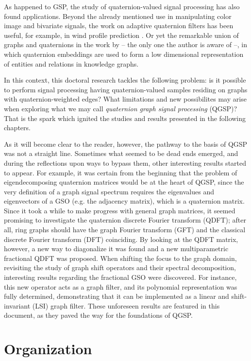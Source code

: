 As happened to GSP, the study of quaternion-valued signal processing has also found applications. Beyond the already mentioned use in manipulating color image and bivariate signals, the work on adaptive quaternion filters has been useful, for example, in wind profile prediction \cite{jiang2014general}. Or yet the remarkable union of graphs and quaternions in the work by \cite{zhang2019quaternion} -- the only one the author is aware of --, in which quaternion embeddings are used to form a low dimensional representation of entities and relations in knowledge graphs.

In this context, this doctoral research tackles the following problem: is it possible to perform signal processing having quaternion-valued samples residing on graphs with quaternion-weighted edges? What limitations and new possibilites may arise when exploring what we may call \textit{quaternion graph signal processing} (QGSP)? That is the spark which ignited the studies and results presented in the following chapters.

As it will become clear to the reader, however, the pathway to the basis of QGSP was not a straight line. Sometimes what seemed to be dead ends emerged, and during the reflections upon ways to bypass them, other interesting results started to appear. For example, it was certain from the beginning that the problem of eigendecomposing quaternion matrices would be at the heart of QGSP, since the very definition of a graph signal spectrum requires the eigenvalues and eigenvectors of a GSO (e.g. the adjacency matrix), which is a quaternion matrix. Since it took a while to make progress with general graph matrices, it seemed promising to investigate the quaternion discrete Fourier transform (QDFT); after all, ring graphs should have the graph Fourier transform (GFT) and the classical discrete Fourier transform (DFT) coinciding. By looking at the QDFT matrix, however, a new way to diagonalize it was found and a new multiparametric fractional QDFT was proposed. When shifting the focus to the graph domain, revisiting the study of graph shift operators and their spectral decomposition, interesting results regarding the fractional GSO were discovered. For instance, this new operator acts as a graph filter, and its polynomial representation was fully determined, demonstrating that it can be implemented as a linear and shift-invariant (LSI) graph filter. These unforeseen results are featured in this document, as they paved the way for the foundations of QGSP.

\section{Organization}


